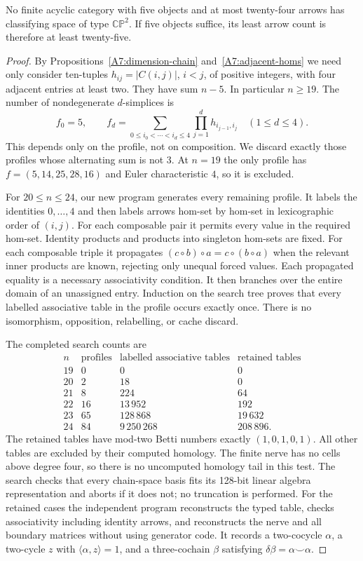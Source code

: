 \begin{theorem}
\label{A7:through24}
No finite acyclic category with five objects and at most twenty-four
arrows has classifying space of type $\mathbb{CP}^2$. If five objects
suffice, its least arrow count is therefore at least twenty-five.
\end{theorem}
\begin{proof}
By Propositions~\ref{A7:dimension-chain} and~\ref{A7:adjacent-homs}
we need only consider ten-tuples $h_{ij}=|C(i,j)|$, $i<j$, of
positive integers, with four adjacent entries at least two.
They have sum $n-5$. In particular $n\ge19$.
The number of nondegenerate $d$-simplices is
\[
 f_0=5,\qquad
 f_d=\sum_{0\le i_0<\cdots<i_d\le4}
       \prod_{j=1}^{d}h_{i_{j-1},i_j}\quad(1\le d\le4).
\]
This depends only on the profile, not on composition. We discard
exactly those profiles whose alternating sum is not $3$. At $n=19$
the only profile has $f=(5,14,25,28,16)$ and Euler characteristic
$4$, so it is excluded.

For $20\le n\le24$, our new program
 generates every remaining
profile. It labels the identities $0,\ldots,4$ and then labels
arrows hom-set by hom-set in lexicographic order of $(i,j)$.
For each composable pair it permits every value in the required
hom-set. Identity products and products into singleton hom-sets
are fixed. For each composable triple it propagates
$(c\circ b)\circ a=c\circ(b\circ a)$ when the relevant inner
products are known, rejecting only unequal forced values. Each
propagated equality is a necessary associativity condition. It then
branches over the entire domain of an unassigned entry. Induction
on the search tree proves that every labelled associative table
in the profile occurs exactly once. There is no isomorphism,
opposition, relabelling, or cache discard.

The completed search counts are
\[
\begin{array}{r|r|r|r}
 n&\text{profiles}&\text{labelled associative tables}
   &\text{retained tables}\\\hline
19&0&0&0\\
20&2&18&0\\
21&8&224&64\\
22&16&13\,952&192\\
23&65&128\,868&19\,632\\
24&84&9\,250\,268&208\,896.
\end{array}
\]
The retained tables have mod-two Betti numbers exactly
$(1,0,1,0,1)$. All other tables are excluded by their computed
homology. The finite nerve has no cells above degree four, so
there is no uncomputed homology tail in this test. The search
checks that every chain-space basis fits its 128-bit linear
algebra representation and aborts if it does not; no truncation
is performed. For the retained cases the independent program
 reconstructs the typed table,
checks associativity including identity arrows, and reconstructs
the nerve and all boundary matrices without using generator code.
It records a two-cocycle $\alpha$, a two-cycle $z$ with
$\langle\alpha,z\rangle=1$, and a three-cochain $\beta$ satisfying
$\delta\beta=\alpha\smile\alpha$.


\end{proof}
